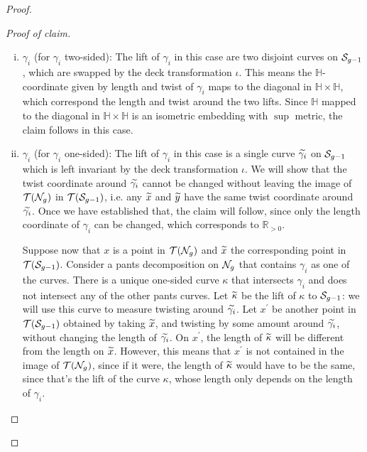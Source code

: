 \documentclass[12pt, reqno]{amsart}
\begin{document}
\begin{proof}
\begin{proof}[Proof of claim]
\begin{enumerate}[(i)]
    In the first case, $\teich(\no_g \setminus \gamma)$ maps to the diagonal subspace in $\teich(S_1) \times \teich(S_2)$, and the metric on $\teich(S_1) \times \teich(S_2)$ is the $\sup$ metric.
    The space $\teich(\no_g)$ maps to the diagonal subspace because its image must be invariant under the map $\iota$, which isometrically swaps $S_1$ and $S_2$.
    This map is an isometric embedding, and thus for any points $x$ and $y$ in $\teich(\no_g \setminus \gamma)$, the distance between their images in $\teich(S_1) \times \teich(S_2)$ is the same as the distance in $\teich(\no_g \setminus \gamma)$.

    In the second case, we have that $\teich(\no_g \setminus \gamma)$ also isometrically embeds inside the Teichmüller space of its double cover, by Theorem \ref{thm:i-embedding-teich-space}, so the claim follows.
  \item $\gamma_i$ (for $\gamma_i$ two-sided): The lift of $\gamma_i$ in this case are two disjoint curves on $\mathcal{S}_{g-1}$, which are swapped by the deck transformation $\iota$.
    This means the $\mathbb{H}$-coordinate given by length and twist of $\gamma_i$ maps to the diagonal in $\mathbb{H} \times \mathbb{H}$, which correspond the length and twist around the two lifts.
    Since $\mathbb{H}$ mapped to the diagonal in $\mathbb{H} \times \mathbb{H}$ is an isometric embedding with $\sup$ metric, the claim follows in this case.
  \item $\gamma_i$ (for $\gamma_i$ one-sided): The lift of $\gamma_i$ in this case is a single curve $\widetilde{\gamma_i}$ on $\mathcal{S}_{g-1}$ which is left invariant by the deck transformation $\iota$.
    We will show that the twist coordinate around $\widetilde{\gamma_i}$ cannot be changed without leaving the image of $\teich(\no_g)$ in $\mathcal{T}(\mathcal{S}_{g-1})$, i.e. any $\widetilde{x}$ and $\widetilde{y}$ have the same twist coordinate around $\widetilde{\gamma_i}$.
    Once we have established that, the claim will follow, since only the length coordinate of $\gamma_i$ can be changed, which corresponds to $\mathbb{R}_{>0}$.

    Suppose now that $x$ is a point in $\mathcal{T}(\mathcal{N}_{g})$ and $\widetilde{x}$ the corresponding point in $\mathcal{T}(\mathcal{S}_{g-1})$.
    Consider a pants decomposition on $\mathcal{N}_g$ that contains $\gamma_i$ as one of the curves. There is a unique one-sided curve $\kappa$ that intersects $\gamma_i$ and does not intersect any of the other pants curves.
    Let $\widetilde{\kappa}$ be the lift of $\kappa$ to $\mathcal{S}_{g-1}$: we will use this curve to measure twisting around $\widetilde{\gamma_i}$.
    Let $x^{\prime}$ be another point in $\mathcal{T}(\mathcal{S}_{g-1})$ obtained by taking $\widetilde{x}$, and twisting by some amount around $\widetilde{\gamma_i}$, without changing the length of $\widetilde{\gamma_i}$.
    On $x^{\prime}$, the length of $\widetilde{\kappa}$ will be different from the length on $\widetilde{x}$.
    However, this means that $x^{\prime}$ is not contained in the image of $\teich(\no_g)$, since if it were, the length of $\widetilde{\kappa}$ would have to be the same, since that's the lift of the curve $\kappa$, whose length only depends on the length of $\gamma_i$.
  \end{enumerate}
  \end{proof}


\end{proof}
\end{document}
